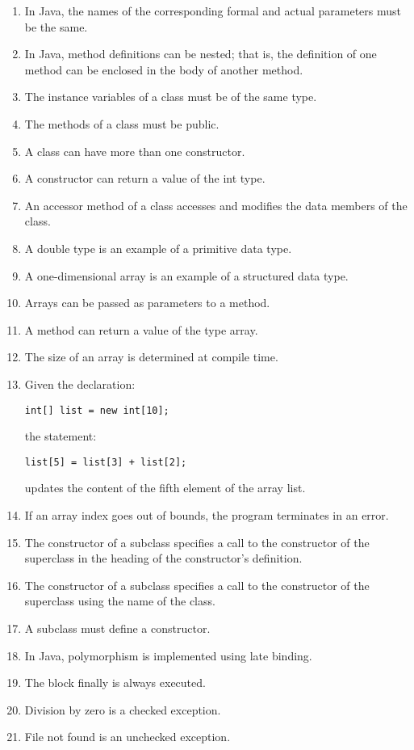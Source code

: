 \documentclass[12pt,a4paper,final,twoside,onecolumn,titlepage]{book}
\begin{document}
\begin{enumerate}
\item In Java, the names of the corresponding formal and actual parameters must be the same.
\item In Java, method definitions can be nested; that is, the definition of one method can be enclosed in the body of another method.
\item The instance variables of a class must be of the same type.
\item The methods of a class must be public.
\item A class can have more than one constructor.
\item A constructor can return a value of the int type.
\item An accessor method of a class accesses and modifies the data members of the class.
\item A double type is an example of a primitive data type.
\item A one-dimensional array is an example of a structured data type.
\item Arrays can be passed as parameters to a method.
\item A method can return a value of the type array.
\item The size of an array is determined at compile time.
\item Given the declaration:
\begin{lstlisting}
int[] list = new int[10];
\end{lstlisting}
the statement:
\begin{lstlisting}
list[5] = list[3] + list[2];
\end{lstlisting}
updates the content of the fifth element of the array list.
\item If an array index goes out of bounds, the program terminates in an error.
\item The constructor of a subclass specifies a call to the constructor of the superclass in the heading of the constructor’s definition.
\item The constructor of a subclass specifies a call to the constructor of the superclass using the name of the class.
\item A subclass must define a constructor.
\item In Java, polymorphism is implemented using late binding.
\item The block finally is always executed.
\item Division by zero is a checked exception.
\item File not found is an unchecked exception.

\end{enumerate}
\end{document}
